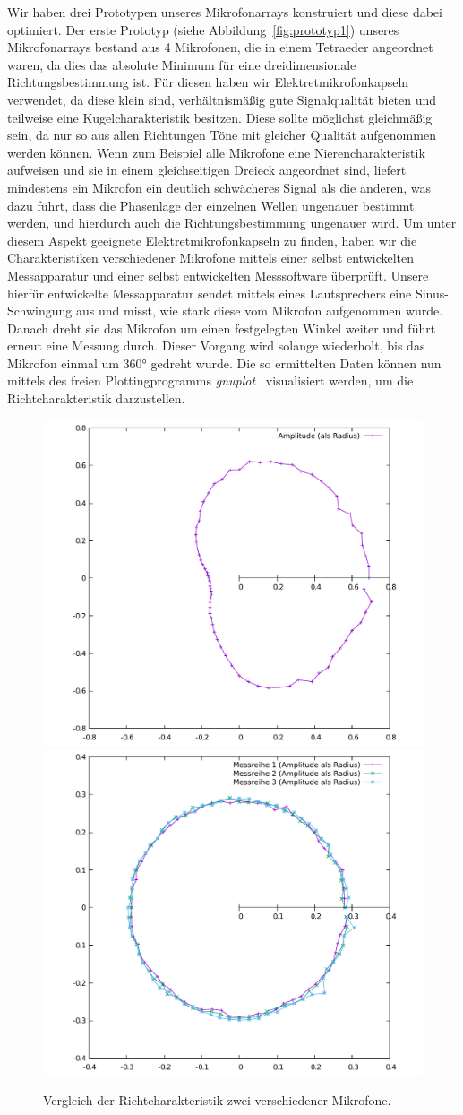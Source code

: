 Wir haben drei Prototypen unseres Mikrofonarrays konstruiert und diese dabei optimiert. Der erste Prototyp (siehe Abbildung~\ref{fig:prototyp1}) unseres Mikrofonarrays bestand aus 4 Mikrofonen, die in einem Tetraeder angeordnet waren, da dies das absolute Minimum für eine dreidimensionale Richtungsbestimmung ist. Für diesen haben wir Elektretmikrofonkapseln verwendet, da diese klein sind, verhältnismäßig gute Signalqualität bieten und teilweise eine Kugelcharakteristik besitzen.
Diese sollte möglichst gleichmäßig sein, da nur so aus allen Richtungen Töne mit gleicher Qualität aufgenommen werden können. Wenn zum Beispiel alle Mikrofone eine Nierencharakteristik aufweisen und sie in einem gleichseitigen Dreieck angeordnet sind, liefert mindestens ein Mikrofon ein deutlich schwächeres Signal als die anderen, was dazu führt, dass die Phasenlage der einzelnen Wellen ungenauer bestimmt werden, und hierdurch auch die Richtungsbestimmung ungenauer wird.
Um unter diesem Aspekt geeignete Elektretmikrofonkapseln zu finden, haben wir die Charakteristiken verschiedener Mikrofone mittels einer selbst entwickelten Messapparatur und einer selbst entwickelten Messsoftware überprüft. Unsere hierfür entwickelte Messapparatur sendet mittels eines Lautsprechers eine Sinus-Schwingung aus und misst, wie stark diese vom Mikrofon aufgenommen wurde. Danach dreht sie das Mikrofon um einen festgelegten Winkel weiter und führt erneut eine Messung durch. Dieser Vorgang wird solange wiederholt, bis das Mikrofon einmal um \ang{360} gedreht wurde.
Die so ermittelten Daten können nun mittels des freien Plottingprogramms \textit{gnuplot}~\cite{Gnuplot} visualisiert werden, um die Richtcharakteristik darzustellen.
\begin{figure}[H]
    \centering
    \includegraphics[width=0.45\linewidth]{img/badMic}
    \includegraphics[width=0.45\linewidth]{img/goodMic}
    \caption{Vergleich der Richtcharakteristik zwei verschiedener Mikrofone.\label{fig:caracter}}
\end{figure}
